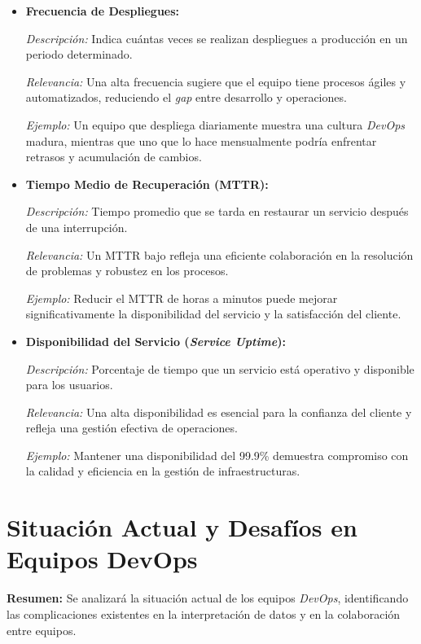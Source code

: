 \documentclass[journal]{IEEEtran}
\begin{document}
\begin{itemize}
    \item \textbf{Frecuencia de Despliegues:}
    
    \textit{Descripción:} Indica cuántas veces se realizan despliegues a producción en un periodo determinado.
    
    \textit{Relevancia:} Una alta frecuencia sugiere que el equipo tiene procesos ágiles y automatizados, reduciendo el \textit{gap} entre desarrollo y operaciones.
    
    \textit{Ejemplo:} Un equipo que despliega diariamente muestra una cultura \textit{DevOps} madura, mientras que uno que lo hace mensualmente podría enfrentar retrasos y acumulación de cambios.
    
    \item \textbf{Tiempo Medio de Recuperación (MTTR):}
    
    \textit{Descripción:} Tiempo promedio que se tarda en restaurar un servicio después de una interrupción.
    
    \textit{Relevancia:} Un MTTR bajo refleja una eficiente colaboración en la resolución de problemas y robustez en los procesos.
    
    \textit{Ejemplo:} Reducir el MTTR de horas a minutos puede mejorar significativamente la disponibilidad del servicio y la satisfacción del cliente.
    
    \item \textbf{Disponibilidad del Servicio (\textit{Service Uptime}):}
    
    \textit{Descripción:} Porcentaje de tiempo que un servicio está operativo y disponible para los usuarios.
    
    \textit{Relevancia:} Una alta disponibilidad es esencial para la confianza del cliente y refleja una gestión efectiva de operaciones.
    
    \textit{Ejemplo:} Mantener una disponibilidad del 99.9\% demuestra compromiso con la calidad y eficiencia en la gestión de infraestructuras.
\end{itemize}

\section{\textbf{\Large Situación Actual y Desafíos en Equipos DevOps}}

\textbf{Resumen:} Se analizará la situación actual de los equipos \textit{DevOps}, identificando las complicaciones existentes en la interpretación de datos y en la colaboración entre equipos.
\end{document}
